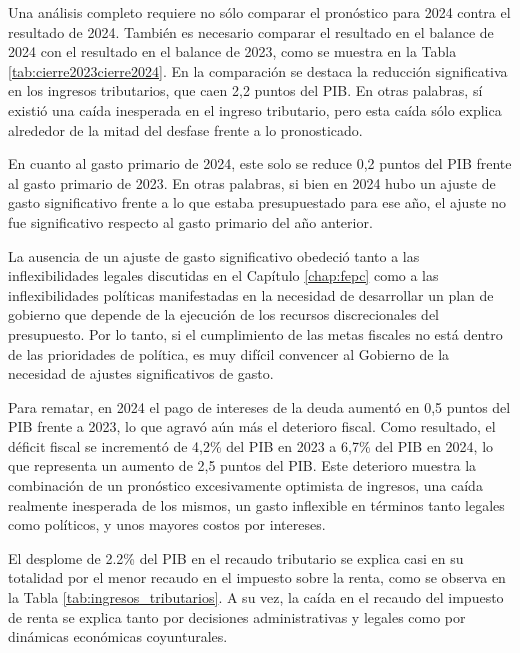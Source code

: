 

Una análisis completo requiere no sólo comparar el pronóstico para 2024 contra el resultado de 2024. También es necesario comparar el resultado en el balance de 2024 con el resultado en el balance de 2023, como se muestra en la Tabla \ref{tab:cierre2023cierre2024}. En la comparación se destaca la reducción significativa en los ingresos tributarios, que caen 2,2 puntos del PIB. En otras palabras, sí existió una caída inesperada en el ingreso tributario, pero esta caída sólo explica alrededor de la mitad del desfase frente a lo pronosticado.

En cuanto al gasto primario de 2024, este solo se reduce 0,2 puntos del PIB frente al gasto primario de 2023. En otras palabras, si bien en 2024 hubo un ajuste de gasto significativo frente a lo que estaba presupuestado para ese año, el ajuste no fue significativo respecto al gasto primario del año anterior. 

La ausencia de un ajuste de gasto significativo obedeció tanto a las inflexibilidades legales discutidas en el Capítulo \ref{chap:fepc} como a las inflexibilidades políticas manifestadas en la necesidad de desarrollar un plan de gobierno que depende de la ejecución de los recursos discrecionales del presupuesto. Por lo tanto, si el cumplimiento de las metas fiscales no está dentro de las prioridades de política, es muy difícil convencer al Gobierno de la necesidad de ajustes significativos de gasto. 

Para rematar, en 2024 el pago de intereses de la deuda aumentó en 0,5 puntos del PIB frente a 2023, lo que agravó aún más el deterioro fiscal. Como resultado, el déficit fiscal se incrementó de 4,2\% del PIB en 2023 a 6,7\% del PIB en 2024, lo que representa un aumento de 2,5 puntos del PIB. Este deterioro muestra la combinación de un pronóstico excesivamente optimista de ingresos, una caída realmente inesperada de los mismos, un gasto inflexible en términos tanto legales como políticos, y unos mayores costos por intereses.



El desplome de 2.2\% del PIB en el recaudo tributario se explica casi en su totalidad por el menor recaudo en el impuesto sobre la renta, como se observa en la Tabla \ref{tab:ingresos_tributarios}. A su vez, la caída en el recaudo del impuesto de renta se explica tanto por decisiones administrativas y legales como por dinámicas económicas coyunturales. 

